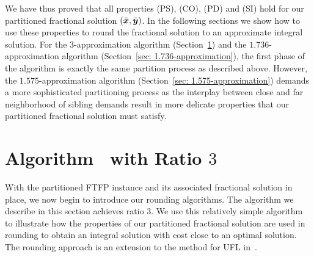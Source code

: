\documentclass{llncs}
\begin{document}
We have thus proved that all properties (PS), (CO), (PD) and (SI) hold
for our partitioned fractional solution $(\bar{\boldsymbol{x}},\bar{\boldsymbol{y}})$. In the
following sections we show how to use these properties to round the
fractional solution to an approximate integral solution. For the
$3$-approximation algorithm (Section~\ref{sec: 3-approximation}) and
the $1.736$-approximation algorithm (Section~\ref{sec:
  1.736-approximation}), the first phase of the algorithm is exactly
the same partition process as described above. However, the
$1.575$-approximation algorithm (Section~\ref{sec:
  1.575-approximation}) demands a more sophisticated partitioning
process as the interplay between close and far neighborhood of sibling
demands result in more delicate properties that our partitioned
fractional solution must satisfy.


\section{Algorithm~{\EGUP} with Ratio $3$}
\label{sec: 3-approximation}

With the partitioned FTFP instance and its associated fractional
solution in place, we now begin to introduce our rounding algorithms.
The algorithm we describe in this section achieves ratio $3$. We use
this relatively simple algorithm to illustrate how the properties of
our partitioned fractional solution are used in rounding to obtain an
integral solution with cost close to an optimal solution. The rounding
approach is an extension to the method for UFL in~\cite{gupta08}.
\end{document}
